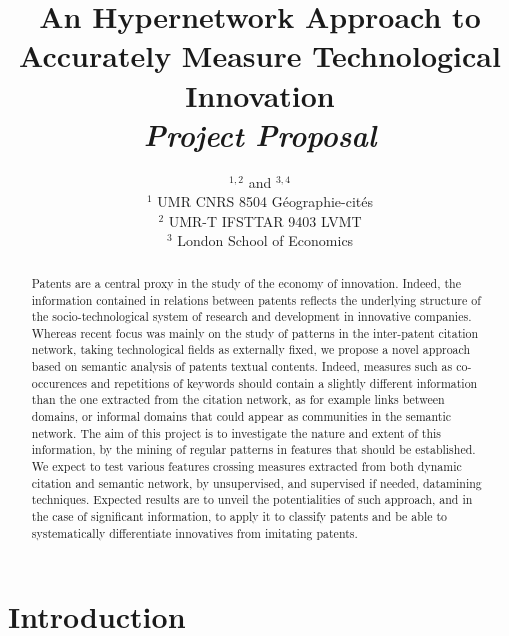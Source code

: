 


\title{
An Hypernetwork Approach to Accurately Measure Technological Innovation
\bigskip\\
\textit{Project Proposal}
}
\author{$^{1,2}$ and $^{3,4}$\medskip\\
$^{1}$ UMR CNRS 8504 G{\'e}ographie-cit{\'e}s\\
$^{2}$ UMR-T IFSTTAR 9403 LVMT\\
$^{3}$ London School of Economics
}
\date{}


\maketitle

\justify


\begin{abstract}
Patents are a central proxy in the study of the economy of innovation. Indeed, the information contained in relations between patents reflects the underlying structure of the socio-technological system of research and development in innovative companies. Whereas recent focus was mainly on the study of patterns in the inter-patent citation network, taking technological fields as externally fixed, we propose a novel approach based on semantic analysis of patents textual contents. Indeed, measures such as co-occurences and repetitions of keywords should contain a slightly different information than the one extracted from the citation network, as for example links between domains, or informal domains that could appear as communities in the semantic network. The aim of this project is to investigate the nature and extent of this information, by the mining of regular patterns in features that should be established. We expect to test various features crossing measures extracted from both dynamic citation and semantic network, by unsupervised, and supervised if needed, datamining techniques. Expected results are to unveil the potentialities of such approach, and in the case of significant information, to apply it to classify patents and be able to systematically differentiate innovatives from imitating patents.
\end{abstract}


\section{Introduction}

